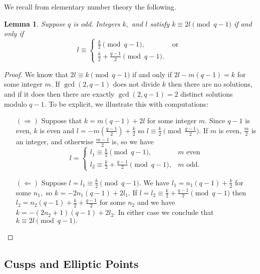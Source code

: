\documentclass[11pt]{amsart}
\newtheorem{lemma}[theorem]{Lemma}
\theoremstyle{definition}
\numberwithin{equation}{section}
\begin{document}
		We recall from elementary number theory the following.
		\begin{lemma}
		\label{l: elementary number theory}
			Suppose $q$ is odd. Integers $k,$ and $l$ satisfy $k\equiv 2l\pmod{q-1}$ if and only if \[l\equiv \begin{cases}\frac{k}{2}\pmod{q-1}, &\text{ or }\\ \frac{k}{2}+\frac{q-1}{2}\pmod{q-1}.\end{cases}\] 
		\end{lemma}
		\begin{proof}
			We know that $2l\equiv k\pmod{q-1}$ if and only if $2l-m(q-1)=k$ for some integer $m.$ If $\gcd(2,q-1)$ does not divide $k$ then there are no solutions, and if it does then there are exactly $\gcd(2,q-1)=2$ distinct solutions modulo $q-1.$ To be explicit, we illustrate this with computations:
			\begin{itemize}
				\item[$(\Rightarrow)$] Suppose that $k=m(q-1)+2l$ for some integer $m.$ Since $q-1$ is even, $k$ is even and $l=-m(\frac{q-1}{2})+\frac{k}{2}$ so $l\equiv\frac{k}{2}\pmod{\frac{q-1}{2}}.$ If $m$ is even, $\frac{m}{2}$ is an integer, and otherwise $\frac{m-1}{2}$ is, so we have
				\[
				l = \begin{cases}
						l_1\equiv \frac{k}{2}\pmod{q-1}, & m\text{ even}\\
						l_2\equiv \frac{k}{2}+\frac{q-1}{2}\pmod{q-1}, & m\text{ odd.}
					\end{cases}\]
				
				\item[$(\Leftarrow)$] Suppose $l=l_1\equiv \frac{k}{2}\pmod{q-1}.$ We have $l_1=n_1(q-1)+\frac{k}{2}$ for some $n_1,$ so $k=-2n_1(q-1)+2l_1.$ If $l=l_2\equiv \frac{k}{2}+\frac{q-1}{2}\pmod{q-1}$ then $l_2=n_2(q-1)+\frac{k}{2}+\frac{q-1}{2}$ for some $n_2$ and we have $k=-(2n_2+1)(q-1)+2l_2.$ In either case we conclude that $k\equiv 2l\pmod{q-1}.$
			\end{itemize}
		\end{proof}
		
		
		\subsection{Cusps and Elliptic Points}
		
\end{document}
